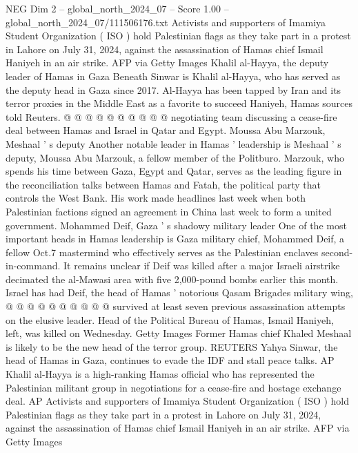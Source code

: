 \begin{textsample}{NEG Dim 2 – global\_north\_2024\_07 – Score 1.00 – global\_north\_2024\_07/111506176.txt}
Activists and supporters of Imamiya Student Organization ( ISO ) hold Palestinian flags as they take part in a protest in Lahore on July 31, 2024, against the assassination of Hamas chief Ismail Haniyeh in an air strike.
AFP via Getty Images Khalil al-Hayya, the deputy leader of Hamas in Gaza Beneath Sinwar is Khalil al-Hayya, who has served as the deputy head in Gaza since 2017.
Al-Hayya has been tapped by Iran and its terror proxies in the Middle East as a favorite to succeed Haniyeh, Hamas sources told Reuters. @ @ @ @ @ @ @ @ @ @ negotiating team discussing a cease-fire deal between Hamas and Israel in Qatar and Egypt.
Moussa Abu Marzouk, Meshaal ' s deputy Another notable leader in Hamas ' leadership is Meshaal ' s deputy, Moussa Abu Marzouk, a fellow member of the Politburo.
Marzouk, who spends his time between Gaza, Egypt and Qatar, serves as the leading figure in the reconciliation talks between Hamas and Fatah, the political party that controls the West Bank.
His work made headlines last week when both Palestinian factions signed an agreement in China last week to form a united government.
Mohammed Deif, Gaza ' s shadowy military leader One of the most important heads in Hamas leadership is Gaza military chief, Mohammed Deif, a fellow Oct.7 mastermind who effectively serves as the Palestinian enclaves second-in-command.
It remains unclear if Deif was killed after a major Israeli airstrike decimated the al-Mawasi area with five 2,000-pound bombs earlier this month.
Israel has had Deif, the head of Hamas ' notorious Qasam Brigades military wing, @ @ @ @ @ @ @ @ @ @ survived at least seven previous assassination attempts on the elusive leader.
Head of the Political Bureau of Hamas, Ismail Haniyeh, left, was killed on Wednesday.
Getty Images Former Hamas chief Khaled Meshaal is likely to be the new head of the terror group.
REUTERS Yahya Sinwar, the head of Hamas in Gaza, continues to evade the IDF and stall peace talks.
AP Khalil al-Hayya is a high-ranking Hamas official who has represented the Palestinian militant group in negotiations for a cease-fire and hostage exchange deal.
AP Activists and supporters of Imamiya Student Organization ( ISO ) hold Palestinian flags as they take part in a protest in Lahore on July 31, 2024, against the assassination of Hamas chief Ismail Haniyeh in an air strike.
AFP via Getty Images

\end{textsample}
